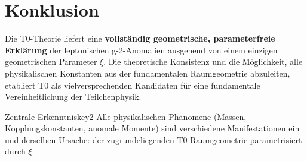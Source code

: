 \documentclass[12pt,a4paper]{article}
\newcommand{\xipar}{\xi}
\begin{document}
	\section{Konklusion}
	
	Die T0-Theorie liefert eine \textbf{vollständig geometrische, parameterfreie Erklärung} der leptonischen g-2-Anomalien ausgehend von einem einzigen geometrischen Parameter $\xipar$. Die theoretische Konsistenz und die Möglichkeit, alle physikalischen Konstanten aus der fundamentalen Raumgeometrie abzuleiten, etabliert T0 als vielversprechenden Kandidaten für eine fundamentale Vereinheitlichung der Teilchenphysik.
	
	\begin{keyresult}{Zentrale Erkenntnis}{key2}
		Alle physikalischen Phänomene (Massen, Kopplungskonstanten, anomale Momente) sind verschiedene Manifestationen ein und derselben Ursache: der zugrundeliegenden T0-Raumgeometrie parametrisiert durch $\xipar$.
	\end{keyresult}
	
\end{document}
